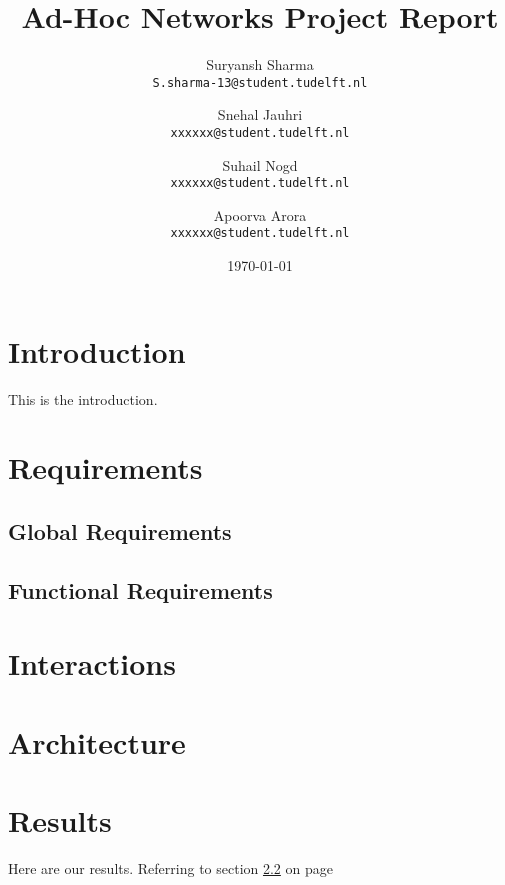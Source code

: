 \documentclass[a4paper,12pt]{article}
\begin{document}
\title{Ad-Hoc Networks Project Report}
\author{
	Suryansh Sharma \\ 
	\texttt{S.sharma-13@student.tudelft.nl}
 	\and 
	Snehal Jauhri \\
	\texttt{xxxxxx@student.tudelft.nl} 
	\and
	Suhail Nogd \\
	\texttt{xxxxxx@student.tudelft.nl} 	
	 \and 
	Apoorva Arora\\
	\texttt{xxxxxx@student.tudelft.nl} 
}

\date {\today}
\maketitle

\section{Introduction}
This is the introduction.

\section{Requirements}

\subsection{Global Requirements}
\label{sec1}

\subsection{Functional Requirements}
\label{sec1}

\section{Interactions} 

\section{Architecture}

\section{Results}
Here are our results. Referring to section \ref{sec1} on page \pageref{sec1}
\end{document}
